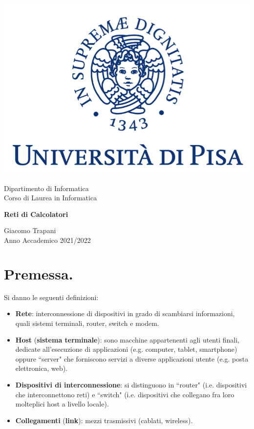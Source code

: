 \documentclass[11pt, italian, openany]{book}
\begin{document}
\begin{sloppypar}
\begin{titlepage}
	\clearpage\thispagestyle{empty}
	\centering
	\vspace{1cm}

	\includegraphics[scale=0.60]{images/unipi-logo.png}

	{\normalsize \noindent Dipartimento di Informatica \\
			Corso di Laurea in Informatica \par}
	
	\vspace{2cm}
	{\Huge \textbf{Reti di Calcolatori} \par }

	\vspace{4cm}

	{\normalsize Giacomo Trapani \\ Anno Accademico 2021/2022\par}

	\pagebreak

\end{titlepage}
\tableofcontents
\listoffigures
\pagebreak
\section*{Premessa.}
Si danno le seguenti definizioni:
\begin{itemize}[topsep=0pt, itemsep=0pt, parsep=0pt]
	\item \textbf{Rete}: interconnessione di dispositivi in grado di scambiarsi informazioni, quali sistemi terminali, router, switch e modem.
	\item \textbf{Host} (\textbf{sistema terminale}): sono macchine appartenenti agli utenti finali, dedicate all'esecuzione di applicazioni (e.g. computer,
	tablet, smartphone) oppure ``server" che forniscono servizi a diverse applicazioni utente (e.g. posta elettronica, web).
	\item \textbf{Dispositivi di interconnessione}: si distinguono in ``router" (i.e. dispositivi che interconnettono reti) e ``switch"
	(i.e. dispositivi che collegano fra loro molteplici host a livello locale).
	\item \textbf{Collegamenti} (\textbf{link}): mezzi trasmissivi (cablati, wireless).
\end{itemize}

\end{sloppypar}
\end{document}
